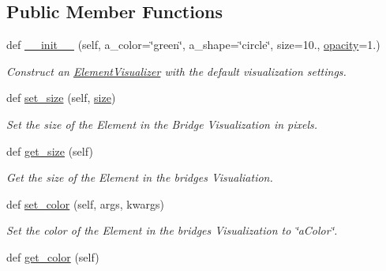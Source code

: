 \subsection*{Public Member Functions}
\begin{DoxyCompactItemize}
\item 
def \mbox{\hyperlink{class_bridges_1_1element__visualizer_1_1_element_visualizer_a8b7a117ef735871e09cac605f0b71c1c}{\+\_\+\+\_\+init\+\_\+\+\_\+}} (self, a\+\_\+color=\char`\"{}green\char`\"{}, a\+\_\+shape=\char`\"{}circle\char`\"{}, size=10., \mbox{\hyperlink{class_bridges_1_1element__visualizer_1_1_element_visualizer_a8c32a4ec0b2de8d90dc9ba32a60d3d31}{opacity}}=1.)
\begin{DoxyCompactList}\small\item\em Construct an \mbox{\hyperlink{class_bridges_1_1element__visualizer_1_1_element_visualizer}{Element\+Visualizer}} with the default visualization settings. \end{DoxyCompactList}\item 
def \mbox{\hyperlink{class_bridges_1_1element__visualizer_1_1_element_visualizer_ad3d6b884bca4cd65a300d7ca5a9a6ebb}{set\+\_\+size}} (self, \mbox{\hyperlink{class_bridges_1_1element__visualizer_1_1_element_visualizer_a310edf0712e14c6d01264ca050166872}{size}})
\begin{DoxyCompactList}\small\item\em Set the size of the Element in the Bridge Visualization in pixels. \end{DoxyCompactList}\item 
def \mbox{\hyperlink{class_bridges_1_1element__visualizer_1_1_element_visualizer_a43e24d7977692b676da745c9a775c2d7}{get\+\_\+size}} (self)
\begin{DoxyCompactList}\small\item\em Get the size of the Element in the bridges Visualiation. \end{DoxyCompactList}\item 
def \mbox{\hyperlink{class_bridges_1_1element__visualizer_1_1_element_visualizer_a5dceeba34842559488e0fca0013d97eb}{set\+\_\+color}} (self, args, kwargs)
\begin{DoxyCompactList}\small\item\em Set the color of the Element in the bridges Visualization to \char`\"{}a\+Color\char`\"{}. \end{DoxyCompactList}\item 
def \mbox{\hyperlink{class_bridges_1_1element__visualizer_1_1_element_visualizer_a9609a09051cba296c42be588786be4da}{get\+\_\+color}} (self)

\end{DoxyCompactItemize}
